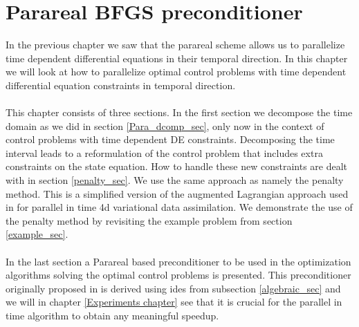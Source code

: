 \chapter{Parareal BFGS preconditioner} \label{method_chap}
In the previous chapter we saw that the parareal scheme allows us to parallelize time dependent differential equations in their temporal direction. In this chapter we will look at how to parallelize optimal control problems with time dependent differential equation constraints in temporal direction. 
\\
\\
This chapter consists of three sections. In the first section we decompose the time domain as we did in section \ref{Para_dcomp_sec}, only now in the context of control problems with time dependent DE constraints. Decomposing the time interval leads to a reformulation of the control problem that includes extra constraints on the state equation. How to handle these new constraints are dealt with in section \ref{penalty_sec}. We use the same approach as \cite{maday2002parareal} namely the penalty method. This is a simplified version of the augmented Lagrangian approach used in \cite{rao2016time} for parallel in time 4d variational data assimilation. We demonstrate the use of the penalty method by revisiting the example problem from section \ref{example_sec}.
\\
\\
In the last section a Parareal based preconditioner to be used in the optimization algorithms solving the optimal control problems is presented. This preconditioner originally proposed in \cite{maday2002parareal} is derived using ides from subsection \ref{algebraic_sec} and we will in chapter \ref{Experiments chapter} see that it is crucial for the parallel in time algorithm to obtain any meaningful speedup. 
